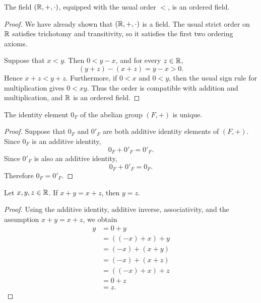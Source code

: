 \documentclass[12pt, a4paper]{article}
\begin{document}
\begin{theorem}
  The field \((\mathbb{R},+,\cdot)\), equipped with the usual order \(<\), is an
  ordered field.
\end{theorem}

\begin{proof}
  We have already shown that \((\mathbb{R},+,\cdot)\) is a field. The usual strict
  order on \(\mathbb{R}\) satisfies trichotomy and transitivity, so it satisfies the
  first two ordering axioms.

  Suppose that \(x<y\). Then \(0<y-x\), and for every \(z\in\mathbb{R}\),
  \[
    (y+z)-(x+z)=y-x>0.
  \]
  Hence \(x+z<y+z\). Furthermore, if \(0<x\) and \(0<y\), then the usual
  sign rule for multiplication gives \(0<xy\). Thus the order
  is compatible with addition and multiplication, and \(\mathbb{R}\) is an ordered
  field.
\end{proof}

\begin{theorem}
  The identity element \(0_F\) of the abelian group \((F, +)\) is unique.
\end{theorem}
\begin{proof}
  Suppose that \(0_F\) and \(0'_F\) are both additive identity elements of
  \((F,+)\). Since \(0_F\) is an additive identity,
  \[
    0_F+0'_F=0'_F.
  \]
  Since \(0'_F\) is also an additive identity,
  \[
    0_F+0'_F=0_F.
  \]
  Therefore \(0_F=0'_F\).
\end{proof}

\begin{theorem}
  Let \(x,y,z \in \mathbb{R}\). If \(x+y=x+z\), then \(y=z\).
\end{theorem}

\begin{proof}
  Using the additive identity, additive inverse, associativity, and the
  assumption \(x+y=x+z\), we obtain
  \begin{align*}
    y
    &=0+y \\
    &=((-x)+x)+y \\
    &=(-x)+(x+y) \\
    &=(-x)+(x+z) \\
    &=((-x)+x)+z \\
    &=0+z \\
    &=z.
  \end{align*}
\end{proof}
\end{document}
